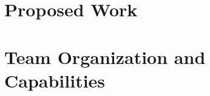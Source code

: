 \documentclass[letterpaper,12pt]{article}
\begin{document}
\section{Proposed Work}

\section{Team Organization and Capabilities}

\nocite{*}
\pagebreak


\end{document}
